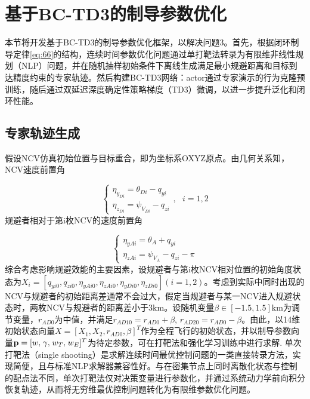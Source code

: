 \section{基于BC-TD3的制导参数优化}
本节将开发基于BC-TD3的制导参数优化框架，以解决问题3。首先，根据闭环制导定律\eqref{eq:66}的结构，连续时间参数优化问题通过单打靶法转录为有限维非线性规划（NLP）问题，并在随机抽样初始条件下离线生成满足最小规避距离和目标到达精度约束的专家轨迹。然后构建BC-TD3网络：actor通过专家演示的行为克隆预训练，随后通过双延迟深度确定性策略梯度（TD3）微调，以进一步提升泛化和闭环性能。

\subsection{专家轨迹生成}
假设NCV仿真初始位置与目标重合，即为坐标系OXYZ原点。由几何关系知，NCV速度前置角

\begin{equation}
\label{eq:67}
\left\{ {\begin{array}{*{20}{l}}
  {{\eta _{{y_{Di}}}} = {\theta _{Di}} - {q_{yi}}} \\ 
  {{\eta _{{z_{Di}}}} = {\psi _{{V_{Di}}}} - {q_{zi}}} 
\end{array},{\text{ }}i = 1,2} \right.
\end{equation}
规避者相对于第i枚NCV的速度前置角

\begin{equation}
\label{eq:68}
\left\{ {\begin{array}{*{20}{l}}
  {{\eta _{yAi}} = {\theta _A} + {q_{yi}}} \\ 
  {{\eta _{zAi}} = {\psi _{{V_A}}} - {q_{zi}} - \pi } 
\end{array}} \right.
\end{equation}
综合考虑影响规避效能的主要因素，设规避者与第i枚NCV相对位置的初始角度状态为${X_i} = [{q_{yi0}},{q_{zi0}},{\eta _{yAi0}},{\eta _{zAi0}},{\eta _{yDi0}},{\eta _{zDi0}}](i = 1,2)$。考虑到实际中同时出现的NCV与规避者的初始距离差通常不会过大，假定当规避者与某一NCV进入规避状态时，两枚NCV与规避者的距离差小于3km。设随机变量$\beta  \in [ - 1.5,1.5]{\text{km}}$为调节变量，${r_{AD{\text{0}}}}$为中值，并满足${r_{AD10}} = {r_{AD0}} + \beta $, ${r_{AD20}} = {r_{AD0}} - \beta $。由此，以14维初始状态向量$X = {[{X_1},{X_2},{r_{AD0}},\beta ]^T}$作为全程飞行的初始状态，并以制导参数向量${\mathbf{p}} = {[w,{\kern 1pt} \gamma ,{\kern 1pt} {w_T},{\kern 1pt} {w_E}]^T}$为待定参数，可在打靶法和强化学习训练中进行求解.
单次打靶法（single shooting）是求解连续时间最优控制问题的一类直接转录方法，实现简便，且与标准NLP求解器兼容性好。与在密集节点上同时离散化状态与控制的配点法不同，单次打靶法仅对决策变量进行参数化，并通过系统动力学前向积分恢复轨迹，从而将无穷维最优控制问题转化为有限维参数优化问题。


